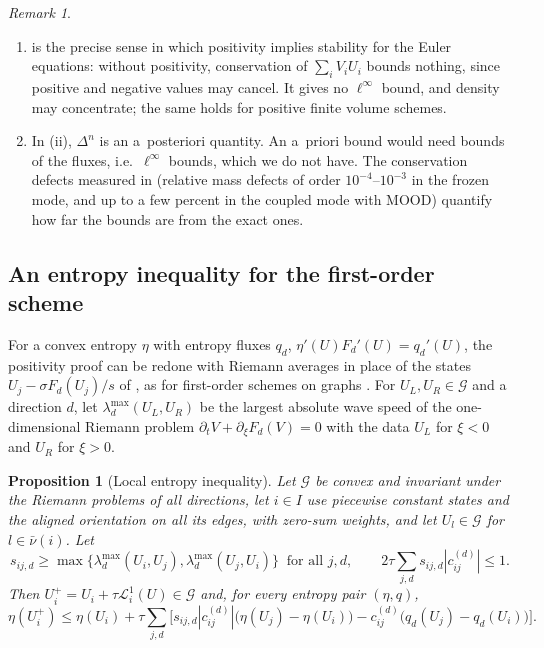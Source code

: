 \documentclass[11pt,a4paper]{article}
\theoremstyle{plain}
\newtheorem{proposition}[theorem]{Proposition}
\theoremstyle{definition}
\theoremstyle{remark}
\newtheorem{remark}[theorem]{Remark}
\numberwithin{equation}{section}
\newcommand{\cnb}{\bar\nu}
\newcommand{\Ad}{\mathcal{G}}
\newcommand{\Lop}{\mathcal{L}}
\newcommand{\A}[1]{\cite[#1]{Addendum}}
\begin{document}
\begin{remark}
\begin{enumerate}[label=(\roman*)]
\item {} is the precise sense in which positivity implies stability for the Euler equations: without positivity, conservation of $\sum_iV_iU_i$ bounds nothing, since positive and negative values may cancel. It gives no $\ell^\infty$ bound, and density may concentrate; the same holds for positive finite volume schemes.
\item In (ii), $\Delta^n$ is an a~posteriori quantity. An a~priori bound would need bounds of the fluxes, i.e.\ $\ell^\infty$ bounds, which we do not have. The conservation defects measured in \cite{JungMUSCL2026} (relative mass defects of order $10^{-4}$--$10^{-3}$ in the frozen mode, and up to a few percent in the coupled mode with MOOD) quantify how far the bounds are from the exact ones.
\end{enumerate}
\end{remark}

\subsection{An entropy inequality for the first-order scheme}

For a convex entropy $\eta$ with entropy fluxes $q_d$, $\eta'(U)F_d'(U)=q_d'(U)$, the positivity proof can be redone with Riemann averages in place of the states $U_j-\sigma F_d(U_j)/s$ of \A{Prop.~5.2}, as for first-order schemes on graphs \cite{GuermondPopov2016}. For $U_L,U_R\in\Ad$ and a direction $d$, let $\lambda^{\max}_d(U_L,U_R)$ be the largest absolute wave speed of the one-dimensional Riemann problem $\partial_tV+\partial_\xi F_d(V)=0$ with the data $U_L$ for $\xi<0$ and $U_R$ for $\xi>0$.

\begin{proposition}[Local entropy inequality]\label{prop:entropy}
Let $\Ad$ be convex and invariant under the Riemann problems of all directions, let $i\in I$ use piecewise constant states and the aligned orientation on all its edges, with zero-sum weights, and let $U_l\in\Ad$ for $l\in\cnb(i)$. Let
\begin{equation}\label{eq:entropycfl}
s_{ij,d}\ge\max\{\lambda^{\max}_d(U_i,U_j),\lambda^{\max}_d(U_j,U_i)\}\ \text{ for all } j,d,\qquad 2\tau\sum_{j,d}s_{ij,d}|c^{(d)}_{ij}|\le1 .
\end{equation}
Then $U^+_i=U_i+\tau\Lop^1_i(U)\in\Ad$ and, for every entropy pair $(\eta,q)$,
\begin{equation}\label{eq:entropy}
\eta(U^+_i)\le\eta(U_i)+\tau\sum_{j,d}\Big[s_{ij,d}|c^{(d)}_{ij}|\big(\eta(U_j)-\eta(U_i)\big)-c^{(d)}_{ij}\big(q_d(U_j)-q_d(U_i)\big)\Big].
\end{equation}
\end{proposition}
\end{document}
